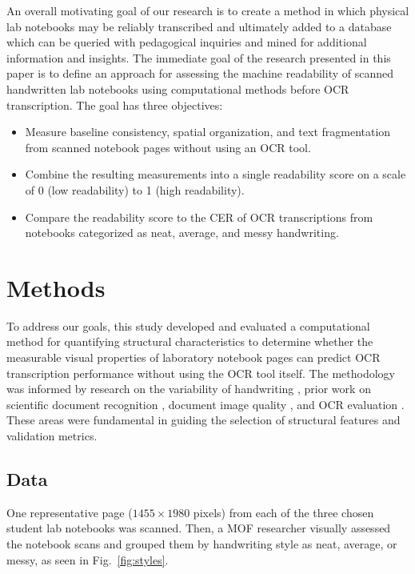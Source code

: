 \documentclass[conference]{IEEEtran}
\begin{document}
An overall motivating goal of our research is to create a method in which
physical lab notebooks may be reliably transcribed and ultimately added to a
database which can be queried with pedagogical inquiries and mined for
additional information and insights. The immediate goal of the research
presented in this paper is to define an approach for assessing the machine
readability of scanned handwritten lab notebooks using computational methods
before OCR transcription. The goal has three objectives:
\begin{itemize}
  \item Measure baseline consistency, spatial organization, and text
        fragmentation from scanned notebook pages without using an OCR tool.
  \item Combine the resulting measurements into a single readability score on a
        scale of 0 (low readability) to 1 (high readability).
  \item Compare the readability score to the CER of OCR transcriptions from
        notebooks categorized as neat, average, and messy handwriting.
\end{itemize}

\section{Methods}
\label{sec:methods}

To address our goals, this study developed and evaluated a computational method
for quantifying structural characteristics to determine whether the measurable
visual properties of laboratory notebook pages can predict OCR transcription
performance without using the OCR tool itself. The methodology was informed by
research on the variability of handwriting \cite{papavassiliou2010, rabaev2026},
prior work on scientific document recognition \cite{pepper2025}, document image
quality \cite{ye2013, alaei2024}, and OCR evaluation
\cite{smith2007, levenshtein1966}. These areas were fundamental in guiding the
selection of structural features and validation metrics.

\subsection{Data}

One representative page ($1455 \times 1980$ pixels) from each of the three
chosen student lab notebooks was scanned. Then, a MOF researcher visually
assessed the notebook scans and grouped them by handwriting style as neat,
average, or messy, as seen in Fig.~\ref{fig:styles}.
\end{document}
